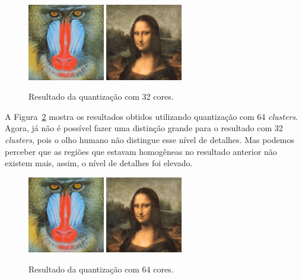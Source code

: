 \documentclass[twoside,twocolumn]{article}
\begin{document}
\begin{figure}[H]
\begin{center}
	\includegraphics[height=3.35cm]{figures/baboon_32.png} \quad
	\includegraphics[height=3.35cm]{figures/monalisa_32.png}
\caption{Resultado da quantização com 32 cores.} \label{quant_32}
\end{center}
\end{figure}

A Figura~\ref{quant_64} mostra os resultados obtidos utilizando quantização com 64 \textit{clusters}. Agora, já não é possível fazer uma distinção grande para o resultado com 32 \textit{clusters}, pois o olho humano não distingue esse nível de detalhes. Mas podemos perceber que as regiões que estavam homogêneas no resultado anterior não existem mais, assim, o nível de detalhes foi elevado.

\begin{figure}[H]
\begin{center}
	\includegraphics[height=3.35cm]{figures/baboon_64.png} \quad
	\includegraphics[height=3.35cm]{figures/monalisa_64.png}
\caption{Resultado da quantização com 64 cores.} \label{quant_64}
\end{center}
\end{figure}
\end{document}
